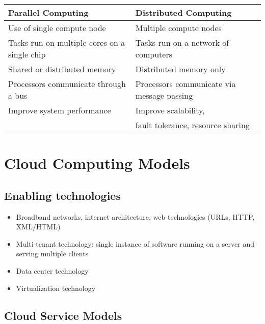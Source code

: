 \documentclass{article}
\begin{document}
\begin{tabular}{|l|l|}
    \hline
    \textbf{Parallel Computing} & \textbf{Distributed Computing}  \\
    \hline
    Use of single compute node & Multiple compute nodes \\
    \hline
    Tasks run on multiple cores on a single chip & Tasks run on a network of computers\\
    \hline
    Shared or distributed memory & Distributed memory only \\
    \hline
    Processors communicate through a bus & Processors communicate via message passing \\
    \hline
    Improve system performance & Improve scalability, \\&fault tolerance, resource sharing \\
    \hline 
\end{tabular}


\section{Cloud Computing Models}

\subsection{Enabling technologies}
\begin{itemize}
    \item Broadband networks, internet architecture, web technologies (URLs, HTTP, XML/HTML)
    
    \item Multi-tenant technology: single instance of software running on a server and serving multiple clients
    
    \item Data center technology
    
    \item Virtualization technology
\end{itemize}

\subsection{Cloud Service Models}
\end{document}
